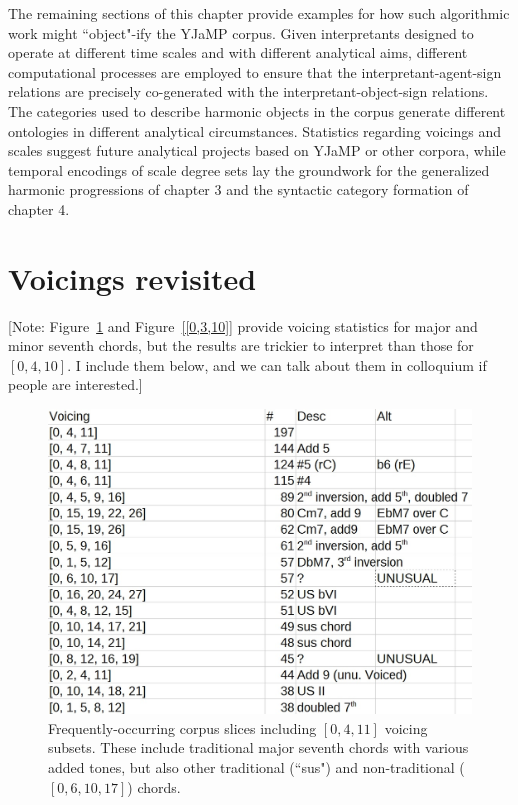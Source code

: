 The remaining sections of this chapter provide examples for how such algorithmic work might ``object"-ify the YJaMP corpus.  Given interpretants designed to operate at different time scales and with different analytical aims, different computational processes are employed to ensure that the interpretant-agent-sign relations are precisely co-generated with the interpretant-object-sign relations.  The categories used to describe harmonic objects in the corpus generate different ontologies in different analytical circumstances.  Statistics regarding voicings and scales suggest future analytical projects based on YJaMP or other corpora, while temporal encodings of scale degree sets lay the groundwork for the generalized harmonic progressions of chapter 3 and the syntactic category formation of chapter 4.
 
\section{Voicings revisited}

[Note: Figure~\ref{[0,4,11]} and Figure~\ref{[0,3,10]} provide voicing statistics for major and minor seventh chords, but the results are trickier to interpret than those for $[0,4,10]$.  I include them below, and we can talk about them in colloquium if people are interested.]

\begin{figure}[h!]
	\centering
	\includegraphics[width=5in]{0411_tones.jpg}
	\caption{Frequently-occurring corpus slices including $[0,4,11]$ voicing subsets.  These include traditional major seventh chords with various added tones, but also other traditional (``sus") and non-traditional ($[0,6,10,17]$) chords.}
	\label{[0,4,11]}
\end{figure}

